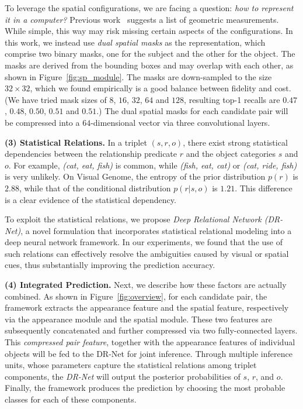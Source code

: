 \documentclass[10pt,twocolumn,letterpaper]{article}
\begin{document}
To leverage the spatial configurations, we are facing a question:
{\em how to represent it in a computer?}
Previous work~\cite{johnson2015image} suggests a list of geometric measurements.
While simple, this way may risk missing certain aspects of the configurations.
%
In this work, we instead use \emph{dual spatial masks} as the representation,
which comprise two binary masks, one for the subject and the other for the object.
The masks are derived from the bounding boxes and may overlap with each other,
as shown in Figure~\ref{fig:sp_module}.
%
The masks are down-sampled to the size $32 \times 32$, 
which we found empirically is a good balance between fidelity and cost.
(We have tried mask sizes of $8$, $16$, $32$, $64$ and $128$, 
resulting top-1 recalls are $0.47$, $0.48$, $0.50$, $0.51$ and $0.51$.)
%
The dual spatial masks for each candidate pair will be compressed into
a $64$-dimensional vector via three convolutional layers.

\textbf{(3) Statistical Relations.}%
In a triplet $(s, r, o)$, 
there exist strong statistical dependencies 
between the relationship predicate $r$ and the object categories $s$ and $o$. 
%
For example, \emph{(cat, eat, fish)} is common, 
while \emph{(fish, eat, cat)} or \emph{(cat, ride, fish)} is very unlikely. 
%
On Visual Genome, the entropy of the prior distribution $p(r)$ is $2.88$,
while that of the conditional distribution $p(r |s, o)$ is $1.21$.
This difference is a clear evidence of the statistical dependency. 

To exploit the statistical relations, we propose 
\emph{Deep Relational Network (DR-Net)},
a novel formulation that incorporates statistical relational modeling
into a deep neural network framework. 
%
In our experiments, we found that the use of such relations can effectively
resolve the ambiguities caused by visual or spatial cues, thus
substantially improving the prediction accuracy.

\textbf{(4) Integrated Prediction.}%
Next, we describe how these factors are actually combined.
%
As shown in Figure~\ref{fig:overview},
for each candidate pair, the framework extracts the appearance 
feature and the spatial feature, respectively via the 
appearance module and the spatial module. 
These two features are subsequently concatenated and further compressed
via two fully-connected layers.
%
This \emph{compressed pair feature}, together with the appearance features
of individual objects will be fed to the DR-Net for joint inference.
%
Through multiple inference units, whose parameters capture the 
statistical relations among triplet components, 
the \emph{DR-Net} will output the posterior probabilities of $s$, $r$, and $o$.
Finally, the framework produces the prediction by choosing
the most probable classes for each of these components. 
\end{document}
